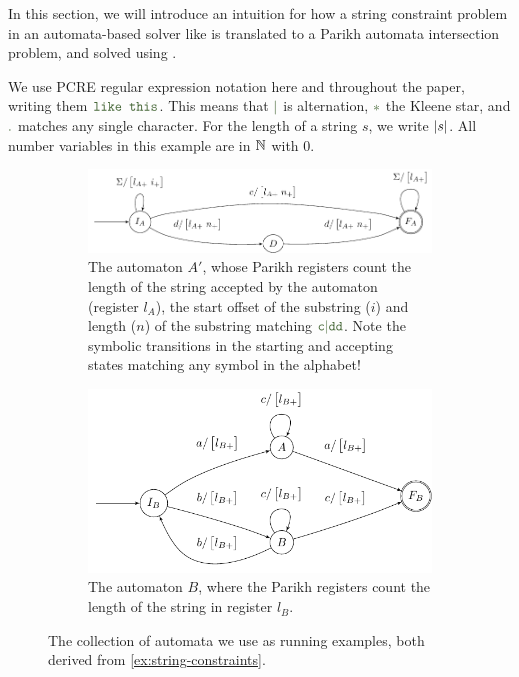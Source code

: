 In this section, we will introduce an intuition for how a string constraint
problem in an automata-based solver like \OstrichPlus{} is translated to a
Parikh automata intersection problem, and solved using \Calculus{}.

We use PCRE regular expression notation here and throughout the paper, writing
them $\Regex{\texttt{like this}}$. This means that $\Regex{\RegexOr{}}$ is alternation,
$\Regex{\mathtt{*}}$ the Kleene star, and $\Regex{\mathtt{.}}$ matches any single character.
For the length of a string $s$, we write $|s|$. All number variables in
this example are in $\mathbb{N}$ with $0$.

\newcommand{\autscale}[0]{0.48}

\begin{figure}[ht]
    \centering 
  \begin{subfigure}[b]{\autscale\textwidth}
    \centering
    \includegraphics[width=\textwidth]{a}
    \caption{The automaton $A'$, whose Parikh registers count the length of the
    string accepted by the automaton (register $l_A$), the start offset of the
    substring ($i$) and length ($n$) of the substring matching
    $\Regex{c\RegexOr{}dd}$. Note the symbolic transitions in the starting and
    accepting states matching any symbol in the alphabet!}\label{fig:aut_a}
  \end{subfigure}%
  \hfill%
  \begin{subfigure}[b]{\autscale\textwidth}
    \centering
    \includegraphics[width=\textwidth]{b}
    \caption{The automaton $B$, where the Parikh registers count the length of
    the string in register $l_B$.}\label{fig:aut_b}
  \end{subfigure}
  \caption{The collection of automata we use as running
  examples, both derived from \cref{ex:string-constraints}.}\label{fig:examples}
\end{figure}


